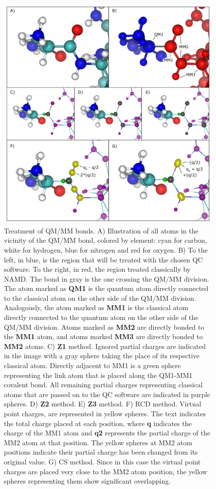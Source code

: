 \begin{figure}[tbp]
\centering
\includegraphics[width=5in]{figures/QMMMBond_2bonds-01.png}
\caption[Treatment of QM/MM bonds]{%
Treatment of QM/MM bonds.
A) Illustration of all atoms in the vicinity of the QM/MM bond, 
colored by element: cyan for carbon, white for hydrogen, 
blue for nitrogen and red for oxygen. 
B) To the left, in blue, is the region that will be treated with 
the chosen QC software. To the right, in red, the region treated 
classically by NAMD. The bond in gray is the one crossing the 
QM/MM division. The atom marked as \textbf{QM1} is the quantum atom 
directly connected to the classical atom on the other side of the 
QM/MM division. Analogously, the atom marked as \textbf{MM1} is the 
classical atom directly connected to the quantum atom on the other 
side of the QM/MM division. Atoms marked as \textbf{MM2} are directly 
bonded to the \textbf{MM1} atom, and atoms marked \textbf{MM3} are 
directly bonded to \textbf{MM2} atoms. 
C) \textbf{Z1} method. Ignored partial charges are indicated in the image 
with a gray sphere taking the place of its respective classical atom. 
Directly adjacent to MM1 is a green sphere representing the link atom 
that is placed along the QM1-MM1 covalent bond. All remaining partial 
charges representing classical atoms that are passed on to the QC software
are indicated in purple spheres. 
D) \textbf{Z2} method.  
E) \textbf{Z3} method. 
F) RCD method. Virtual point charges, are represented in yellow spheres. 
The text indicates the total charge placed at each position, 
where \textbf{q} indicates the charge of the MM1 atom and \textbf{q2} 
represents the partial charge of the MM2 atom at that position. 
The yellow spheres at MM2 atom positions indicate their partial charge 
has been changed from its original value. 
G) CS method. Since in this case the virtual point charges are placed 
very close to the MM2 atom position, the yellow spheres representing 
them show significant overlapping.
}
\label{fig:qmmm_bond_treatment}
\end{figure}


